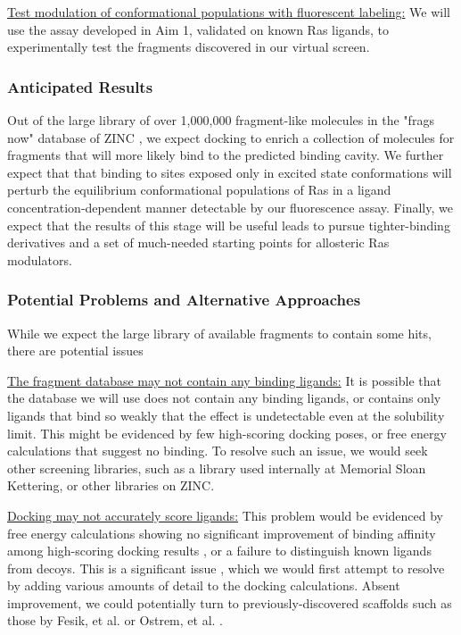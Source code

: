 \documentclass[12pt]{article}
\begin{document}
\underline{Test modulation of conformational populations with fluorescent labeling:} We will use the assay developed in Aim 1, validated on known Ras ligands, to experimentally test the fragments discovered in our virtual screen.

\subsubsection*{Anticipated Results}

Out of the large library of over 1,000,000 fragment-like molecules in the "frags now" database of ZINC \cite{irwin2012}, we expect docking to enrich a collection of molecules for fragments that will more likely bind to the predicted binding cavity. We further expect that that binding to sites exposed only in excited state conformations will perturb the equilibrium conformational populations of Ras in a ligand concentration-dependent manner detectable by our fluorescence assay. Finally, we expect that the results of this stage will be useful leads to pursue tighter-binding derivatives and a set of much-needed starting points for allosteric Ras modulators.

\subsubsection*{Potential Problems and Alternative Approaches}

While we expect the large library of available fragments to contain some hits, there are potential issues

\underline{The fragment database may not contain any binding ligands:} It is possible that the database we will use does not contain any binding ligands, or contains only ligands that bind so weakly that the effect is undetectable even at the solubility limit. This might be evidenced by few high-scoring docking poses, or free energy calculations that suggest no binding. To resolve such an issue, we would seek other screening libraries, such as a library used internally at Memorial Sloan Kettering, or other libraries on ZINC.

\underline{Docking may not accurately score ligands:} This problem would be evidenced by free energy calculations showing no significant improvement of binding affinity among high-scoring docking results \cite{warren2006}, or a failure to distinguish known ligands from decoys. This is a significant issue \cite{warren2006}, which we would first attempt to resolve by adding various amounts of detail to the docking calculations. Absent improvement, we could potentially turn to previously-discovered scaffolds such as those by Fesik, et al. \cite{fesik} or Ostrem, et al.  \cite{ostrem2013}.
\end{document}
